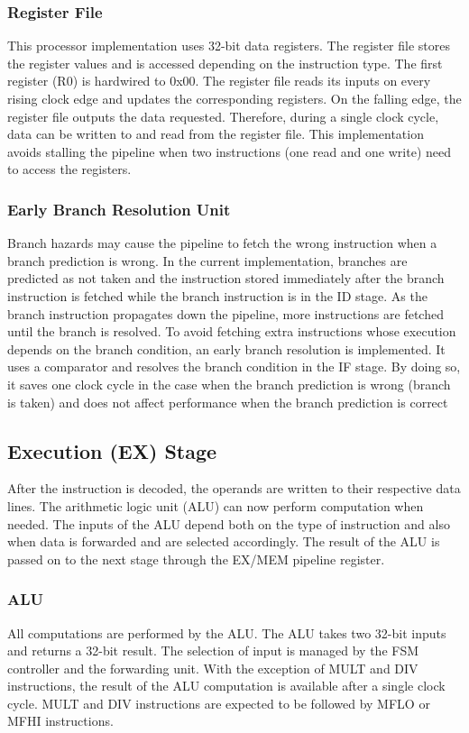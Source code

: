 \documentclass[conference]{IEEEtran}
\begin{document}
\subsubsection{Register File}
This processor implementation uses 32-bit data registers. The register file stores the register values and is accessed depending on the instruction type. The first register (R0) is hardwired to 0x00. The register file reads its inputs on every rising clock edge and updates the corresponding registers. On the falling edge, the register file outputs the data requested. Therefore, during a single clock cycle, data can be written to and read from the register file. This implementation avoids stalling the pipeline when two instructions (one read and one write) need to access the registers.

\subsubsection{Early Branch Resolution Unit}
Branch hazards may cause the pipeline to fetch the wrong instruction when a branch prediction is wrong. In the current implementation, branches are predicted as not taken and the instruction stored immediately after the branch instruction is fetched while the branch instruction is in the ID stage. As the branch instruction propagates down the pipeline, more instructions are fetched until the branch is resolved. To avoid fetching extra instructions whose execution depends on the branch condition, an early branch resolution is implemented. It uses a comparator and resolves the branch condition in the IF stage. By doing so, it saves one clock cycle in the case when the branch prediction is wrong (branch is taken) and does not affect performance when the branch prediction is correct

\subsection{Execution (EX) Stage}

After the instruction is decoded, the operands are written to their respective data lines. The arithmetic logic unit (ALU) can now perform computation when needed. The inputs of the ALU depend both on the type of instruction and also when data is forwarded and are selected accordingly. The result of the ALU is passed on to the next stage through the EX/MEM pipeline register.

\subsubsection{ALU}
All computations are performed by the ALU. The ALU takes two 32-bit inputs and returns a 32-bit result.  The selection of input is managed by the FSM controller and the forwarding unit. With the exception of MULT and DIV instructions, the result of the ALU computation is available after a single clock cycle. MULT and DIV instructions are expected to be followed by MFLO or MFHI instructions. 
\end{document}
